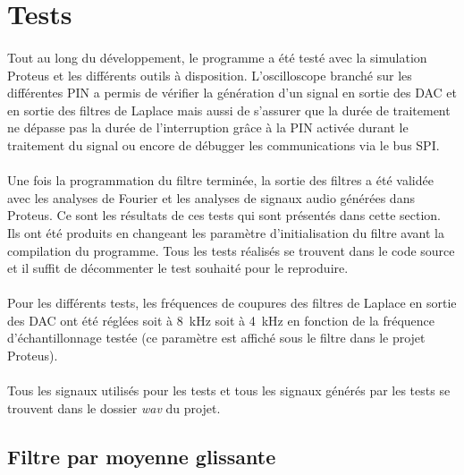 \documentclass{article}
\begin{document}
    \section{Tests}
    \paragraph{}
    Tout au long du développement, le programme a été testé avec la simulation Proteus et les différents outils à disposition. L'oscilloscope branché sur les différentes PIN a permis de vérifier la génération d'un signal en sortie des DAC et en sortie des filtres de Laplace mais aussi de s'assurer que la durée de traitement ne dépasse pas la durée de l'interruption grâce à la PIN activée durant le traitement du signal ou encore de débugger les communications via le bus SPI.

    \paragraph{}
    Une fois la programmation du filtre terminée, la sortie des filtres a été validée avec les analyses de Fourier et les analyses de signaux audio générées dans Proteus. Ce sont les résultats de ces tests qui sont présentés dans cette section. Ils ont été produits en changeant les paramètre d'initialisation du filtre avant la compilation du programme. Tous les tests réalisés se trouvent dans le code source et il suffit de décommenter le test souhaité pour le reproduire.

    \paragraph{}
    Pour les différents tests, les fréquences de coupures des filtres de Laplace en sortie des DAC ont été réglées soit à \SI{8}{\kilo\hertz} soit à \SI{4}{\kilo\hertz} en fonction de la fréquence d'échantillonnage testée (ce paramètre est affiché sous le filtre dans le projet Proteus).

    \paragraph{}
    Tous les signaux utilisés pour les tests et tous les signaux générés par les tests se trouvent dans le dossier \emph{wav} du projet.


    \subsection{Filtre par moyenne glissante}
\end{document}
